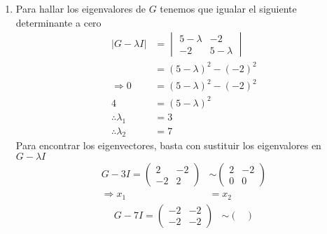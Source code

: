 \documentclass[12pt, letterpaper]{article}
\begin{document}
\begin{enumerate}
\begin{equation*}
\begin{pmatrix}
                3
            \end{pmatrix}
        \right\}, \dim B = 1
    \end{equation*}
    \item Para hallar los eigenvalores de $G$ tenemos que igualar el siguiente determinante a cero
    \begin{equation*}
        \begin{aligned}
            |G - \lambda I|
            & = \begin{vmatrix}
                5-\lambda & -2 \\
                -2 & 5-\lambda
            \end{vmatrix} \\
            & = (5-\lambda)^2 - (-2)^2 \\
            \Rightarrow 0 & = (5-\lambda)^2 - (-2)^2 \\
            4 & = (5-\lambda)^2 \\
            \therefore \lambda_{1} & = 3 \\
            \therefore \lambda_{2} & = 7
        \end{aligned}
    \end{equation*}
    Para encontrar los eigenvectores, basta con sustituir los eigenvalores en $G-\lambda I$
    \begin{equation*}
        \begin{aligned}
            G - 3I =
            \begin{pmatrix}
                2 & -2 \\
                -2 & 2
            \end{pmatrix}
            & \sim
            \begin{pmatrix}
                2 & -2 \\
                0 & 0
            \end{pmatrix} \\
            \Rightarrow x_{1} & = x_{2}
        \end{aligned}
    \end{equation*}
    \begin{equation*}
        \begin{aligned}
            G - 7I =
            \begin{pmatrix}
                -2 & -2 \\
                -2 & -2
            \end{pmatrix}
            & \sim
            \begin{pmatrix}

\end{pmatrix}
\end{aligned}
\end{equation*}
\end{enumerate}
\end{document}
